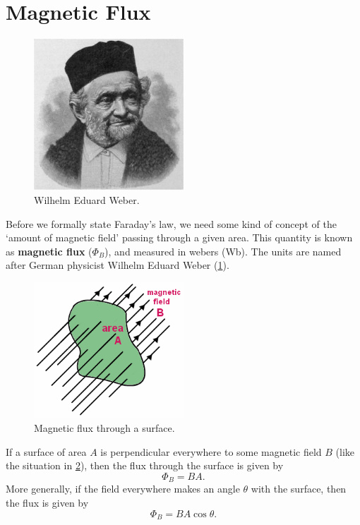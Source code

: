 \documentclass[a4paper]{amsbook}
\theoremstyle{definition}
\numberwithin{exercise}{chapter}
\numberwithin{exercise}{chapter}
\begin{document}
\section{Magnetic Flux}
\begin{figure}
  \centering
  \includegraphics[width=0.5\textwidth]{weber}
  \caption{Wilhelm Eduard Weber.}\label{fig:weber}
\end{figure}
Before we formally state Faraday's law, we need some kind of concept of the `amount of magnetic field' passing through a given
area. This quantity is known as \textbf{magnetic flux} ($ \Phi_B $), and measured in webers (Wb). The units are named after German
physicist Wilhelm Eduard Weber (\cref{fig:weber}).

\begin{figure}
  \centering
  \includegraphics[width=0.5\textwidth]{flux}
  \caption{Magnetic flux through a surface.}\label{fig:flux}
\end{figure}
If a surface of area $ A $ is perpendicular everywhere to some magnetic field $ B $ (like the situation in \cref{fig:flux}), then the flux
through the surface is given by
\begin{equation}
  \Phi_B = BA.
\end{equation}
More generally, if the field everywhere makes an angle $ \theta $ with the surface, then the flux is given by
\begin{equation}
  \Phi_B = BA \cos \theta.
\end{equation}
\end{document}
